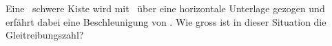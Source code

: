 Eine \mKiO\ schwere Kiste wird mit \FZuO\ über eine horizontale Unterlage gezogen und erfährt dabei eine Beschleunigung von \aKiO. Wie gross ist in dieser Situation die Gleitreibungszahl?
